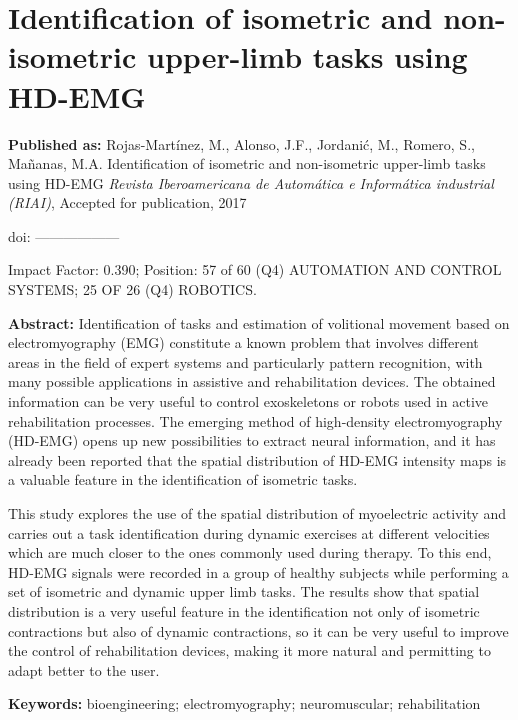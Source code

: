 \newpage
{}


\chapter[Isometric and non-isometric task identification]{Identification of isometric and non-isometric upper-limb tasks using HD-EMG}
\label{RIAI}
\textbf{Published as:} 
Rojas-Mart\'inez, M., Alonso, J.F., Jordani\'c, M., Romero, S., Ma\~nanas, M.A.
Identification of isometric and non-isometric upper-limb tasks using HD-EMG 
\textit{Revista Iberoamericana de Autom\'atica e Inform\'atica industrial (RIAI)}, Accepted for publication, 2017

doi: ------------------

Impact Factor: 0.390; Position: 57 of 60 (Q4) AUTOMATION AND CONTROL SYSTEMS; 25 OF 26 (Q4) ROBOTICS.


\textbf{Abstract:} Identification of tasks and estimation of volitional movement based on electromyography (EMG) constitute a known problem that involves different areas in the field of expert systems and particularly pattern recognition, with many possible applications in assistive and rehabilitation devices. The obtained information can be very useful to control exoskeletons or robots used in active rehabilitation processes. The emerging method of high-density electromyography (HD-EMG) opens up new possibilities to extract neural information, and it has already been reported that the spatial distribution of HD-EMG intensity maps is a valuable feature in the identification of isometric tasks.

This study explores the use of the spatial distribution of myoelectric activity and carries out a task identification during dynamic exercises at different velocities which are much closer to the ones commonly used during therapy. To this end, HD-EMG signals were recorded in a group of healthy subjects while performing a set of isometric and dynamic upper limb tasks. The results show that spatial distribution is a very useful feature in the identification not only of isometric contractions but also of dynamic contractions, so it can be very useful to improve the control of rehabilitation devices, making it more natural and permitting to adapt better to the user.

\textbf{Keywords:}  bioengineering; electromyography; neuromuscular; rehabilitation

